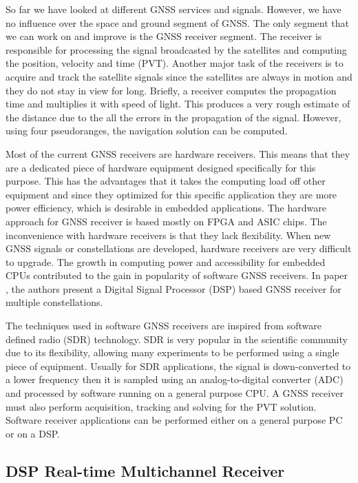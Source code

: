 So far we have looked at different GNSS services and signals. However, we have no influence over the space and ground segment of GNSS. The only segment that we can work on and improve is the GNSS receiver segment. The receiver is responsible for processing the signal broadcasted by the satellites and computing the position, velocity and time (PVT)\cite{receivers}. Another major task of the receivers is to acquire and track the satellite signals since the satellites are always in motion and they do not stay in view for long\cite{receivers}. Briefly, a receiver computes the propagation time and multiplies it with speed of light. This produces a very rough estimate of the distance due to the all the errors in the propagation of the signal. However, using four pseudoranges, the navigation solution can be computed. 

Most of the current GNSS receivers are hardware receivers. This means that they are a dedicated piece of hardware equipment designed specifically for this purpose. This has the advantages that it takes the computing load off other equipment and since they optimized for this specific application they are more power efficiency, which is desirable in embedded applications. The hardware approach for GNSS receiver is based mostly on FPGA and ASIC chips\cite{dsp_receiver}. The inconvenience with hardware receivers is that they lack flexibility. When new GNSS signals or constellations are developed, hardware receivers are very difficult to upgrade. The growth in computing power and accessibility for embedded CPUs contributed to the gain in popularity of software GNSS receivers. In paper \cite{dsp_receiver}, the authors present a Digital Signal Processor (DSP) based GNSS receiver for multiple constellations.

The techniques used in software GNSS receivers are inspired from software defined radio (SDR) technology. SDR is very popular in the scientific community due to its flexibility, allowing many experiments to be performed using a single piece of equipment. Usually for SDR applications, the signal is down-converted to a lower frequency then it is sampled using an analog-to-digital converter (ADC) and processed by software running on a general purpose CPU. A GNSS receiver must also perform acquisition, tracking and solving for the PVT solution\cite{dsp_receiver}. Software receiver applications can be performed either on a general purpose PC or on a DSP. 

\subsection{DSP Real-time Multichannel Receiver\cite{dsp_receiver}}
\label{subsec:dsp_recv}

